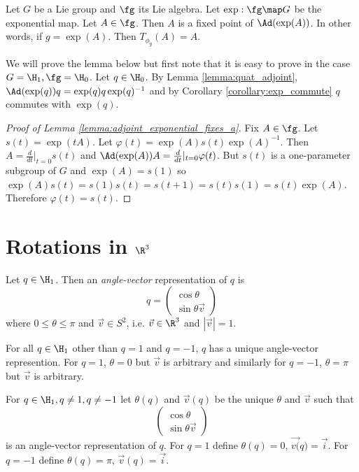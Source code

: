 \documentclass[oneside,12pt]{amsart}
\begin{document}
\begin{lemma}
\label{lemma:adjoint_exponential_fixes_a}
Let $G$ be a Lie group and $\fg$ its Lie algebra. Let $\exp:\fg\map G$ be the exponential map.
Let $A\in \fg$. Then $A$ is a fixed point of $\Ad(\exp(A))$.
In other words, if $g=\exp(A)$. Then $T_{\phi_g}(A) = A$. 
\end{lemma}

We will prove the lemma below but first note that it is easy to prove in the case
$G=\H_1, \fg = \H_0$.  Let $q\in\H_0$.
By Lemma \ref{lemma:quat_adjoint}, $\Ad(\exp(q))q = \exp(q) q  \exp(q)^{-1}$ and by
Corollary \ref{corollary:exp_commute} $q$ commutes with $\exp(q)$. 

\begin{proof}[Proof of Lemma \ref{lemma:adjoint_exponential_fixes_a}]
Fix $A\in\fg$. Let $s(t) = \exp(tA)$. Let $\varphi(t) = \exp(A) s(t) \exp(A)^{-1}$.
Then $A = \frac{d}{dt}\vert_{t=0} s(t)$ and $\Ad(\exp(A)) A = \frac{d}{dt}\vert_{t=0} \varphi(t)$.
But $s(t)$ is a one-parameter subgroup of $G$ and $\exp(A)=s(1)$ so $\exp(A) s(t) = s(1)s(t) = s(t+1) = s(t)s(1) = s(t)\exp(A)$. Therefore $\varphi(t)=s(t)$.
\end{proof}

\section{Rotations in $\R^3$}
\begin{definition}
Let $q\in\H_1$. Then an \emph{angle-vector} representation of $q$ is
$$q = \begin{pmatrix} \cos \theta \\ \sin \theta \vec{v} \end{pmatrix}$$
where $0\leq\theta\leq\pi$ and $\vec{v}\in S^2$, i.e. $\vec{v}\in\R^3$ and $|\vec{v}| = 1$.
\end{definition}

\begin{remark}
For all $q\in\H_1$ other than $q=1$ and $q=-1$, $q$ has a unique angle-vector represention.
For $q=1$, $\theta=0$ but $\vec{v}$ is arbitrary and similarly
for $q=-1$, $\theta=\pi$ but $\vec{v}$ is arbitrary.
\end{remark}

\begin{definition}
For $q\in\H_1, q \not= 1, q\not=-1$ let $\theta(q)$ and $\vec{v}(q)$ be the unique
$\theta$ and $\vec{v}$ such that
$$\begin{pmatrix} \cos \theta \\ \sin \theta \vec{v} \end{pmatrix}$$
is an angle-vector representation of $q$. For $q=1$ define $\theta(q)=0$, $\vec{v(}q)=\vec{i}$.
For $q=-1$ define $\theta(q)=\pi$, $\vec{v}(q)=\vec{i}$.
\end{definition}
\end{document}
